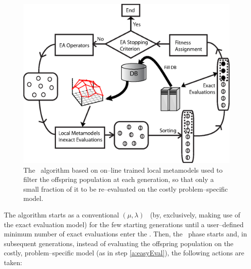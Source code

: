 \documentclass{vki_ls}
\begin{document}
\begin{figure}
    \centering
    \includegraphics[scale=0.7]{on-line_ipe}
    \caption{The \IPE\ algorithm based on on--line trained local metamodels 
	     used to filter the offspring population at each generation, so 
	     that only a small fraction of it to be re--evaluated on the 
	     costly problem--specific model.}
    \label{f:on-line-ipe}
\end{figure}
%
The algorithm starts as a conventional $(\mu, \lambda)$ \EA\ (by, exclusively, making use of the exact evaluation model) for the few starting generations until a user--defined minimum number of exact evaluations enter the \DB. 
Then, the \IPE\ phase starts and, in subsequent generations, instead of evaluating the offspring population on the costly, problem--specific model (as in step \ref{a:easyEval}), the following actions are taken:
%
\end{document}
